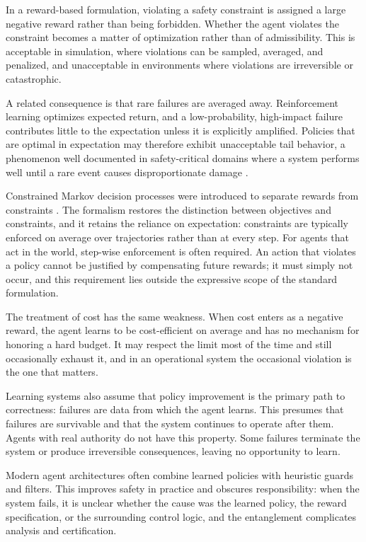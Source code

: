 \documentclass[11pt]{book}
\begin{document}
In a reward-based formulation, violating a safety constraint is assigned a large negative reward rather than being forbidden. Whether the agent violates the constraint becomes a matter of optimization rather than of admissibility. This is acceptable in simulation, where violations can be sampled, averaged, and penalized, and unacceptable in environments where violations are irreversible or catastrophic.

A related consequence is that rare failures are averaged away. Reinforcement learning optimizes expected return, and a low-probability, high-impact failure contributes little to the expectation unless it is explicitly amplified. Policies that are optimal in expectation may therefore exhibit unacceptable tail behavior, a phenomenon well documented in safety-critical domains where a system performs well until a rare event causes disproportionate damage \cite{amodei2016concrete}.

Constrained Markov decision processes were introduced to separate rewards from constraints \cite{altman1999constrained}. The formalism restores the distinction between objectives and constraints, and it retains the reliance on expectation: constraints are typically enforced on average over trajectories rather than at every step. For agents that act in the world, step-wise enforcement is often required. An action that violates a policy cannot be justified by compensating future rewards; it must simply not occur, and this requirement lies outside the expressive scope of the standard formulation.

The treatment of cost has the same weakness. When cost enters as a negative reward, the agent learns to be cost-efficient on average and has no mechanism for honoring a hard budget. It may respect the limit most of the time and still occasionally exhaust it, and in an operational system the occasional violation is the one that matters.

Learning systems also assume that policy improvement is the primary path to correctness: failures are data from which the agent learns. This presumes that failures are survivable and that the system continues to operate after them. Agents with real authority do not have this property. Some failures terminate the system or produce irreversible consequences, leaving no opportunity to learn.

Modern agent architectures often combine learned policies with heuristic guards and filters. This improves safety in practice and obscures responsibility: when the system fails, it is unclear whether the cause was the learned policy, the reward specification, or the surrounding control logic, and the entanglement complicates analysis and certification.
\end{document}
